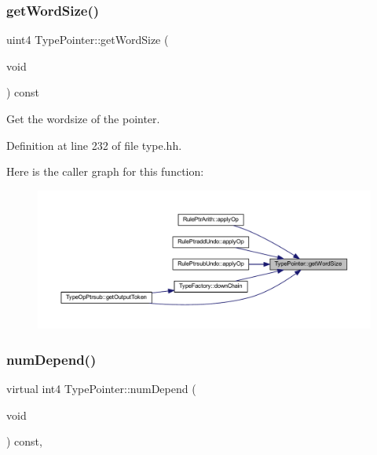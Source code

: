 \subsubsection{\texorpdfstring{getWordSize()}{getWordSize()}}
{\footnotesize\ttfamily uint4 Type\+Pointer\+::get\+Word\+Size (\begin{DoxyParamCaption}\item[{void}]{ }\end{DoxyParamCaption}) const\hspace{0.3cm}{\ttfamily [inline]}}



Get the wordsize of the pointer. 



Definition at line 232 of file type.\+hh.

Here is the caller graph for this function\+:
\nopagebreak
\begin{figure}[H]
\begin{center}
\leavevmode
\includegraphics[width=350pt]{class_type_pointer_a6991671504f1098ccba2bcc40adcd3e9_icgraph}
\end{center}
\end{figure}
\mbox{\label{class_type_pointer_a376a0feb3fb85e98df0a7a9f1eeee0ce}} 
\subsubsection{\texorpdfstring{numDepend()}{numDepend()}}
{\footnotesize\ttfamily virtual int4 Type\+Pointer\+::num\+Depend (\begin{DoxyParamCaption}\item[{void}]{ }\end{DoxyParamCaption}) const\hspace{0.3cm}{\ttfamily [inline]}, {\ttfamily [virtual]}}



